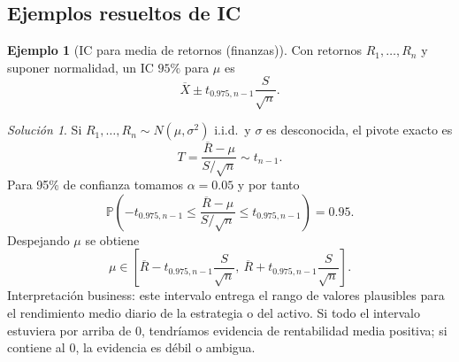 \documentclass[11pt]{article}
\theoremstyle{plain}
\theoremstyle{definition}
\newtheorem{example}[theorem]{Ejemplo}
\theoremstyle{remark}
\theoremstyle{solstyle}
\newtheorem*{solution}{Solución}
\newcommand{\Pbb}{\mathbb{P}}
\newcommand{\1}{\mathbbm{1}}
\newcommand{\Xbar}{\overline{X}}
\begin{document}
\subsection{Ejemplos resueltos de IC}

\begin{example}[IC para media de retornos (finanzas)]
Con retornos $R_1,\dots,R_n$ y suponer normalidad, un IC $95\%$ para $\mu$ es
\[
\Xbar \pm t_{0.975,n-1}\frac{S}{\sqrt n}.
\]
\end{example}

\begin{solution}
Si $R_1,\dots,R_n\sim N(\mu,\sigma^2)$ i.i.d.\ y $\sigma$ es desconocida, el pivote exacto es
\[
T=\frac{\overline R-\mu}{S/\sqrt n}\sim t_{n-1}.
\]
Para 95\% de confianza tomamos $\alpha=0.05$ y por tanto
\[
\Pbb\!\left(-t_{0.975,n-1}\le \frac{\overline R-\mu}{S/\sqrt n}\le t_{0.975,n-1}\right)=0.95.
\]
Despejando $\mu$ se obtiene
\[
\mu\in\left[\overline R-t_{0.975,n-1}\frac{S}{\sqrt n},\ \overline R+t_{0.975,n-1}\frac{S}{\sqrt n}\right].
\]
Interpretación business: este intervalo entrega el rango de valores plausibles para el rendimiento medio diario de la estrategia o del activo. Si todo el intervalo estuviera por arriba de $0$, tendríamos evidencia de rentabilidad media positiva; si contiene al $0$, la evidencia es débil o ambigua.
\end{solution}

\begin{center}
\end{center}
\end{document}
